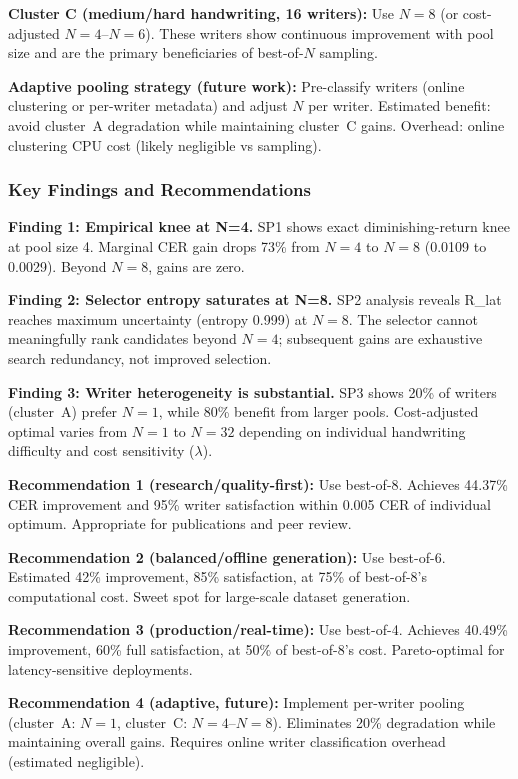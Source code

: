 \documentclass[10.5pt,a4paper]{article}
\begin{document}
\textbf{Cluster C (medium/hard handwriting, 16 writers):} Use $N{=}8$ (or cost-adjusted $N{=}4$--$N{=}6$). These writers show
continuous improvement with pool size and are the primary beneficiaries of best-of-$N$ sampling.

\textbf{Adaptive pooling strategy (future work):} Pre-classify writers (online clustering or per-writer metadata) and adjust
$N$ per writer. Estimated benefit: avoid cluster~A degradation while maintaining cluster~C gains. Overhead: online clustering
CPU cost (likely negligible vs sampling).

\subsubsection{Key Findings and Recommendations}

\textbf{Finding 1: Empirical knee at N=4.} SP1 shows exact diminishing-return knee at pool size 4. Marginal CER gain drops
73\% from $N{=}4$ to $N{=}8$ (0.0109 to 0.0029). Beyond $N{=}8$, gains are zero.

\textbf{Finding 2: Selector entropy saturates at N=8.} SP2 analysis reveals R\_lat reaches maximum uncertainty (entropy 0.999)
at $N{=}8$. The selector cannot meaningfully rank candidates beyond $N{=}4$; subsequent gains are exhaustive search redundancy,
not improved selection.

\textbf{Finding 3: Writer heterogeneity is substantial.} SP3 shows 20\% of writers (cluster~A) prefer $N{=}1$, while 80\%
benefit from larger pools. Cost-adjusted optimal varies from $N{=}1$ to $N{=}32$ depending on individual handwriting difficulty
and cost sensitivity ($\lambda$).

\textbf{Recommendation 1 (research/quality-first):} Use best-of-8. Achieves 44.37\% CER improvement and 95\% writer satisfaction
within 0.005 CER of individual optimum. Appropriate for publications and peer review.

\textbf{Recommendation 2 (balanced/offline generation):} Use best-of-6. Estimated 42\% improvement, 85\% satisfaction, at 75\%
of best-of-8's computational cost. Sweet spot for large-scale dataset generation.

\textbf{Recommendation 3 (production/real-time):} Use best-of-4. Achieves 40.49\% improvement, 60\% full satisfaction, at
50\% of best-of-8's cost. Pareto-optimal for latency-sensitive deployments.

\textbf{Recommendation 4 (adaptive, future):} Implement per-writer pooling (cluster~A: $N{=}1$, cluster~C: $N{=}4$--$N{=}8$).
Eliminates 20\% degradation while maintaining overall gains. Requires online writer classification overhead (estimated negligible).
\end{document}
